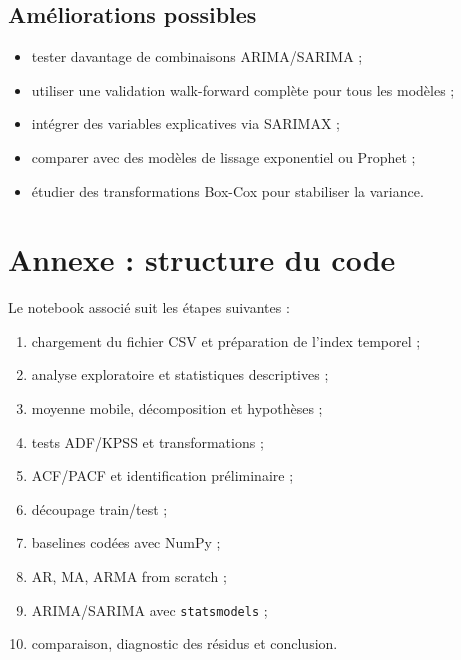 \documentclass[12pt,a4paper]{report}
\begin{document}
\section{Améliorations possibles}
\begin{itemize}
    \item tester davantage de combinaisons ARIMA/SARIMA ;
    \item utiliser une validation walk-forward complète pour tous les modèles ;
    \item intégrer des variables explicatives via SARIMAX ;
    \item comparer avec des modèles de lissage exponentiel ou Prophet ;
    \item étudier des transformations Box-Cox pour stabiliser la variance.
\end{itemize}

\chapter*{Annexe : structure du code}
Le notebook associé suit les étapes suivantes :
\begin{enumerate}
    \item chargement du fichier CSV et préparation de l'index temporel ;
    \item analyse exploratoire et statistiques descriptives ;
    \item moyenne mobile, décomposition et hypothèses ;
    \item tests ADF/KPSS et transformations ;
    \item ACF/PACF et identification préliminaire ;
    \item découpage train/test ;
    \item baselines codées avec NumPy ;
    \item AR, MA, ARMA from scratch ;
    \item ARIMA/SARIMA avec \texttt{statsmodels} ;
    \item comparaison, diagnostic des résidus et conclusion.
\end{enumerate}
\end{document}
